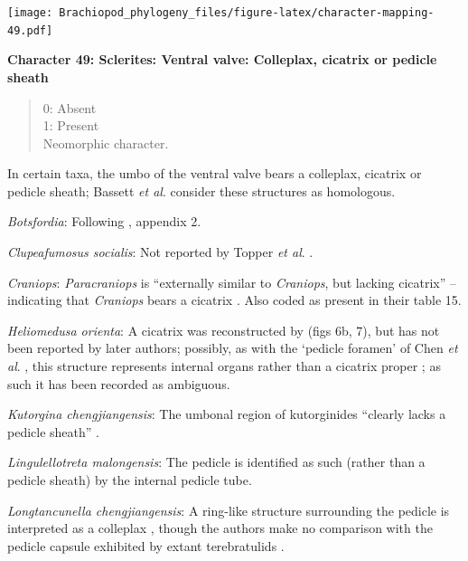 \documentclass[openany]{book}
\theoremstyle{definition}
\theoremstyle{definition}
\theoremstyle{definition}
\theoremstyle{remark}
\begin{document}
\texttt{[image: Brachiopod\_phylogeny\_files/figure-latex/character-mapping-49.pdf]}

\textbf{Character 49: Sclerites: Ventral valve: Colleplax, cicatrix or
pedicle sheath}

\begin{quote}
0: Absent\\
1: Present\\
Neomorphic character.
\end{quote}

In certain taxa, the umbo of the ventral valve bears a colleplax,
cicatrix or pedicle sheath; Bassett \emph{et al}.
\citeyearpar{Bassett2008Earlyontogeny} consider these structures as
homologous.

\hypertarget{Botsfordia-coding-49}{}
\emph{Botsfordia}: Following \citet{Williams1998Thediversity}, appendix
2.

\hypertarget{Clupeafumosus_socialis-coding-49}{}
\emph{Clupeafumosus socialis}: Not reported by Topper \emph{et al}.
\citeyearpar{Topper2013Reappraisalof}.

\hypertarget{Craniops-coding-49}{}
\emph{Craniops}: \emph{Paracraniops} is ``externally similar to
\emph{Craniops}, but lacking cicatrix'' -- indicating that
\emph{Craniops} bears a cicatrix
\citep{Williams2000LinguliformeaCraniiformea}. Also coded as present in
their table 15.

\hypertarget{Heliomedusa_orienta-coding-49}{}
\emph{Heliomedusa orienta}: A cicatrix was reconstructed by
\citet{Jin1992Revisionof} (figs 6b, 7), but has not been reported by
later authors; possibly, as with the `pedicle foramen' of Chen \emph{et
al}. \citeyearpar{Chen2007Reinterpretationof}, this structure represents
internal organs rather than a cicatrix proper
\citep{Zhang2009Architectureand}; as such it has been recorded as
ambiguous.

\hypertarget{Kutorgina_chengjiangensis-coding-49}{}
\emph{Kutorgina chengjiangensis}: The umbonal region of kutorginides
``clearly lacks a pedicle sheath'' \citep{Holmer2018Theattachment}.

\hypertarget{Lingulellotreta_malongensis-coding-49}{}
\emph{Lingulellotreta malongensis}: The pedicle is identified as such
(rather than a pedicle sheath) by the internal pedicle tube.

\hypertarget{Longtancunella_chengjiangensis-coding-49}{}
\emph{Longtancunella chengjiangensis}: A ring-like structure surrounding
the pedicle is interpreted as a colleplax
\citep{Zhang2011Theexceptionally}, though the authors make no comparison
with the pedicle capsule exhibited by extant terebratulids
\citep[see][]{Holmer2018Evolutionarysignificance}.
\end{document}
